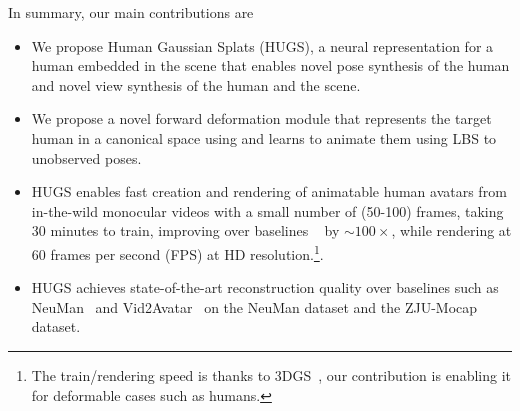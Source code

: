In summary, our main contributions are 
\begin{itemize}[leftmargin=*]
    \item We propose Human Gaussian Splats (HUGS), a neural representation for a human embedded in the scene that enables novel pose synthesis of the human and novel view synthesis of the human and the scene. 
    \item We propose a novel forward deformation module that represents the target human in a canonical space using \gauss and learns to animate them using LBS to unobserved poses.
    \item HUGS enables fast creation and rendering of animatable human avatars from in-the-wild monocular videos with a small number of (50-100) frames, taking 30 minutes to train, improving over baselines ~\cite{jiang2022neuman, guo2023vid2avatar} by ${\sim}100{\times}$, while rendering at {60 frames per second (FPS)} at HD resolution.\footnote{The train/rendering speed is thanks to 3DGS~\cite{kerbl3Dgaussians}, our contribution is enabling it for deformable cases such as humans.}. 
    \item HUGS achieves state-of-the-art reconstruction quality over baselines such as NeuMan~\cite{jiang2022neuman} and Vid2Avatar~\cite{guo2023vid2avatar} on the NeuMan dataset and the ZJU-Mocap dataset.
\end{itemize}


